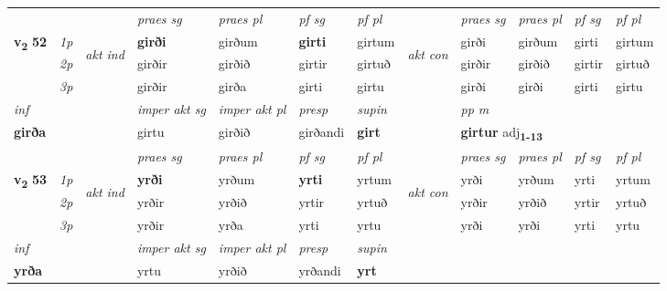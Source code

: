 \begin{longtable}[l]{X>{\footnotesize\itshape}llXXXXlXXXX}
 & &   & \textit{praes sg}  & \textit{praes pl}    & \textit{ pf sg} & \textit{pf pl} & & \textit{praes sg}  & \textit{praes pl}    & \textit{pf sg} & \textit{pf pl }  \\ \cmidrule{4-7} \cmidrule{9-12}
 \multirow{2}{*}{{{\textbf{v{\textsubscript{2}}} \Large{\textbf{52}}}}}  & 1p & \multirow{3}{*}{\begin{turn}{90}\textit{akt ind}\end{turn}} & \textbf{girði} & girðum & \textbf{girti} & girtum & \multirow{3}{*}{\begin{turn}{90}\textit{akt con}\end{turn}} &girði & girðum & girti & girtum\\*
 & 2p &  &  girðir  & girðið & girtir & girtuð & & girðir & girðið & girtir & girtuð \\*
 & 3p &  & girðir & girða & girti & girtu & & girði & girði& girti & girtu \\*
\cmidrule{4-7} \cmidrule{9-12}

   {\textit{inf}} & &  & \textit{imper akt sg} & \textit{imper akt pl}   & \textit{presp} & \textit{supin}  && \textit{pp m} \\*
  {\textbf{girða}} & && girtu  & girðið   & girðandi &  \textbf{girt}  && \multicolumn{2}{l}{\textbf{girtur} adj\textbf{\textsubscript{1-13}}} \\*

\midrule

 & &   & \textit{praes sg}  & \textit{praes pl}    & \textit{ pf sg} & \textit{pf pl} & & \textit{praes sg}  & \textit{praes pl}    & \textit{pf sg} & \textit{pf pl }  \\ \cmidrule{4-7} \cmidrule{9-12}
 \multirow{2}{*}{{{\textbf{v{\textsubscript{2}}} \Large{\textbf{53}}}}}  & 1p & \multirow{3}{*}{\begin{turn}{90}\textit{akt ind}\end{turn}} & \textbf{yrði} & yrðum & \textbf{yrti} & yrtum & \multirow{3}{*}{\begin{turn}{90}\textit{akt con}\end{turn}} &yrði & yrðum & yrti & yrtum\\*
 & 2p &  &  yrðir  & yrðið & yrtir & yrtuð & & yrðir & yrðið & yrtir & yrtuð \\*
 & 3p &  & yrðir & yrða & yrti & yrtu & & yrði & yrði& yrti & yrtu \\*
\cmidrule{4-7} \cmidrule{9-12}

   {\textit{inf}} & &  & \textit{imper akt sg} & \textit{imper akt pl}   & \textit{presp} & \textit{supin}   \\*
  {\textbf{yrða}} & && yrtu  & yrðið   & yrðandi &  \textbf{yrt}   \\*


\end{longtable}
